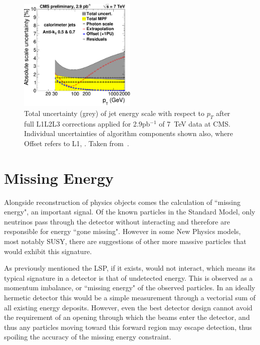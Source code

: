 \begin{figure}
\centering
\includegraphics[width=0.5\textwidth]{Figures/Objects/JESU}
\caption[Total uncertainty (grey) of jet energy scale with respect to $p_{T}$ after full L1L2L3 corrections applied for 2.9\,pb$^{-1}$ of 7~TeV data at CMS. ]{\label{fig:JESU}Total uncertainty (grey) of jet energy scale with respect to $p_{T}$ after full L1L2L3 corrections applied for 2.9pb$^{-1}$ of 7~TeV data at CMS. Individual uncertainties of algorithm components shown also, where Offset refers to L1, . Taken from~\cite{JME-10-010}.}
\end{figure}

\section{Missing Energy}

Alongside reconstruction of physics objects comes the calculation of ``missing energy", an important signal. Of the known particles in the Standard Model,  only neutrinos pass through the detector without interacting and therefore are responsible for energy ``gone missing". However in some New Physics models, most notably SUSY, there are suggestions of other more massive particles that would exhibit this signature. 
 
As previously mentioned the LSP, if it exists, would not interact, which means its typical signature in a detector is that of undetected energy. This is observed as a momentum imbalance, or ``missing energy" of the observed particles. In an ideally hermetic detector this would be a simple measurement through a vectorial sum of all existing energy deposits. However, even the best detector design cannot avoid the requirement of an opening through which the beams enter the detector, and thus any particles moving toward this forward region may escape detection, thus spoiling the accuracy of the missing energy constraint. 

